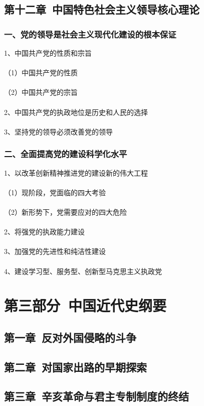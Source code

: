 \documentclass{ctexart}
\begin{document}
\subsection{第十二章\ 中国特色社会主义领导核心理论}
\subsubsection{一、党的领导是社会主义现代化建设的根本保证}
1、中国共产党的性质和宗旨
\\\\
（1）中国共产党的性质
\\\\
（2）中国共产党的宗旨
\\\\

2、中国共产党的执政地位是历史和人民的选择
\\\\

3、坚持党的领导必须改善党的领导
\subsubsection{二、全面提高党的建设科学化水平}
1、以改革创新精神推进党的建设新的伟大工程
\\\\
（1）现阶段，党面临的四大考验
\\\\
（2）新形势下，党需要应对的四大危险
\\\\

2、将强党的执政能力建设
\\\\

3、加强党的先进性和纯洁性建设
\\\\

4、建设学习型、服务型、创新型马克思主义执政党

\section{第三部分\ 中国近代史纲要}
\subsection{第一章\ 反对外国侵略的斗争}
\subsection{第二章\ 对国家出路的早期探索}
\subsection{第三章\ 辛亥革命与君主专制制度的终结}
\end{document}
